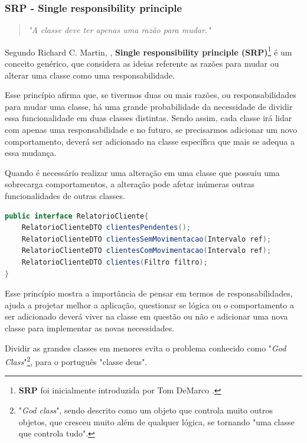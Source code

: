 \documentclass[12pt]{article}
\begin{document}
\subsubsection{SRP - Single responsibility principle}

\begin{quote}
	\textit{"A classe deve ter apenas uma razão para mudar."}
\end{quote}

Segundo Richard C. Martin, \cite{ROBERT_MARTIN_THE_CLEAN_ARCHITECTURE}, \textbf{Single responsibility principle (SRP)}\footnote{\textbf{SRP} foi inicialmente introduzida por Tom DeMarco \cite{SASS_SRP}.} é um conceito genérico, que considera as ideias referente as razões para mudar ou alterar uma classe como uma responsabilidade.

Esse princípio afirma que, se tivermos duas ou mais razões, ou responsabilidades para mudar uma classe, há uma grande probabilidade da necessidade de dividir essa funcionalidade em duas classes distintas. Sendo assim, cada classe irá lidar com apenas uma responsabilidade e no futuro, se precisarmos adicionar um novo comportamento, deverá ser adicionado na classe específica que mais se adequa a essa mudança.

Quando é necessário realizar uma alteração em uma classe que possuiu uma sobrecarga comportamentos, a alteração pode afetar inúmeras outras funcionalidades de outras classes.

\begin{lstlisting}[caption=Exemplo em conformidade ao SRP,language=java]
public interface RelatorioCliente{
	RelatorioClienteDTO clientesPendentes();
	RelatorioClienteDTO clientesSemMovimentacao(Intervalo ref);
	RelatorioClienteDTO clientesComMovimentacao(Intervalo ref);
	RelatorioClienteDTO clientes(Filtro filtro);
}
\end{lstlisting}

Esse princípio mostra a importância de pensar em termos de responsabilidades, ajuda a projetar melhor a aplicação, questionar se lógica ou o comportamento a ser adicionado deverá viver na classe em questão ou não e adicionar uma nova classe para implementar as novas necessidades.

Dividir as grandes classes em menores evita o problema conhecido como "\textit{God Class}"\footnote{"\textit{God class}", sendo descrito como um objeto que controla muito outros objetos, que cresceu muito além de qualquer lógica, se tornando "uma classe que controla tudo".}\cite{GOD_CLASS}, para o português "classe deus".
\end{document}
